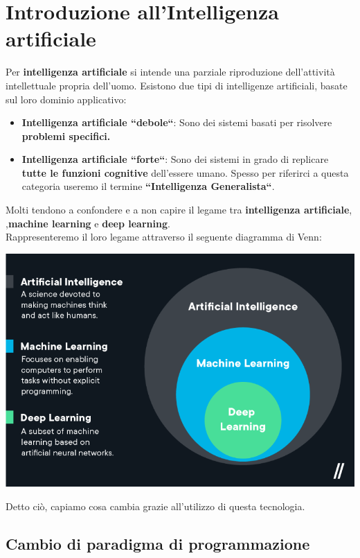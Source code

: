 \section{Introduzione all'Intelligenza artificiale}
{
    Per \textbf{intelligenza artificiale} si intende una parziale 
%
    riproduzione dell'attività intellettuale propria dell'uomo.
}
Esistono due tipi di intelligenze artificiali, basate sul loro 
%
dominio applicativo:
\begin{itemize}
    \item \textbf{Intelligenza artificiale ``debole``}:
    Sono dei sistemi basati per risolvere \textbf{problemi specifici.}
    \item \textbf{Intelligenza artificiale ``forte``}:
    Sono dei sistemi in grado di replicare \textbf{tutte le funzioni cognitive}
%
    dell'essere umano. Spesso per riferirci a questa categoria useremo il termine
%
    \textbf{``Intelligenza Generalista``}.
\end{itemize}
Molti tendono a confondere e a non capire il legame tra \textbf{intelligenza artificiale},
%
,\textbf{machine learning} e \textbf{deep learning}.
\\
Rappresenteremo il loro legame attraverso il seguente diagramma di Venn:
\begin{center}
    \includegraphics[scale=0.7]{images/AI_ML_DL.png}
\end{center}
Detto ciò, capiamo cosa cambia grazie all'utilizzo di questa tecnologia.
\subsection{Cambio di paradigma di programmazione}
